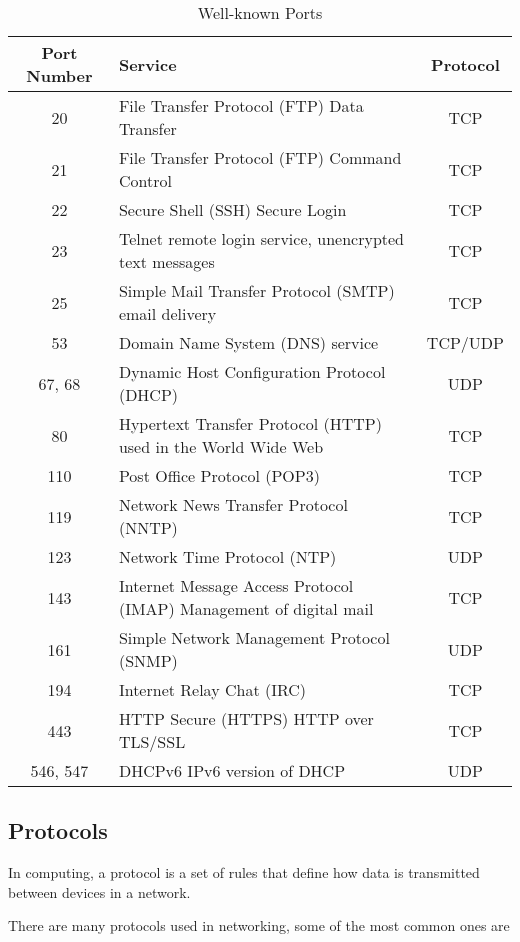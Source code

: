 \begin{table*}[h!]
\caption{Well-known Ports}
\begin{tabular}{c l c}
\toprule
Port Number & Service & Protocol \\
\midrule
20 & File Transfer Protocol (FTP) Data Transfer & TCP \\
21 & File Transfer Protocol (FTP) Command Control & TCP \\
22 & Secure Shell (SSH) Secure Login & TCP \\
23 & Telnet remote login service, unencrypted text messages & TCP \\
25 & Simple Mail Transfer Protocol (SMTP) email delivery & TCP \\
53 & Domain Name System (DNS) service & TCP/UDP \\
67, 68 & Dynamic Host Configuration Protocol (DHCP) & UDP \\
80 & Hypertext Transfer Protocol (HTTP) used in the World Wide Web & TCP \\
110 & Post Office Protocol (POP3) & TCP \\
119 & Network News Transfer Protocol (NNTP) & TCP \\
123 & Network Time Protocol (NTP) & UDP \\
143 & Internet Message Access Protocol (IMAP) Management of digital mail & TCP \\
161 & Simple Network Management Protocol (SNMP) & UDP \\
194 & Internet Relay Chat (IRC) & TCP \\
443 & HTTP Secure (HTTPS) HTTP over TLS/SSL & TCP \\
546, 547 & DHCPv6 IPv6 version of DHCP & UDP \\
\bottomrule
\end{tabular}
\end{table*}

\subsection{Protocols}

\begin{definition}[Protocols]
In computing, a protocol is a set of rules that define
how data is transmitted between devices in a network.
\end{definition}

There are many protocols used in networking, some of
the most common ones are

